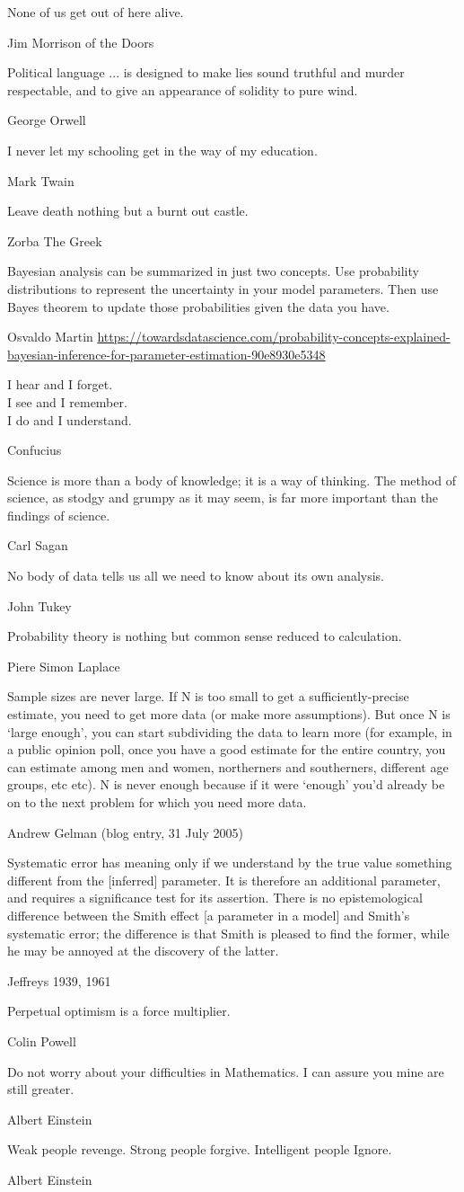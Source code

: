 \epigraph{None of us get out of here alive.}{Jim Morrison of the Doors}
\epigraph{Political language ... is designed to make lies sound truthful and murder respectable, and to give an appearance of solidity to pure wind.}{George Orwell}
\epigraph{I never let my schooling get in the way of my education.}{Mark Twain}
\epigraph{Leave death nothing but a burnt out castle.}{Zorba The Greek}
\epigraph{Bayesian analysis can be summarized in just two concepts. Use probability distributions to represent the uncertainty in your model parameters. Then use Bayes theorem to update those probabilities given the data you have.}{Osvaldo Martin \url{https://towardsdatascience.com/probability-concepts-explained-bayesian-inference-for-parameter-estimation-90e8930e5348}}
\epigraph{I hear and I forget. \\ I see and I remember. \\ I do and I understand.}{Confucius}
\epigraph{Science is more than a body of knowledge; it is a way of thinking. The method of science, as stodgy and grumpy as it may seem, is far more important than the findings of science.}{Carl Sagan}
\epigraph{No body of data tells us all we need to know about its own analysis.}{John Tukey}
\epigraph{Probability theory is nothing but common sense reduced to calculation.}{Piere Simon Laplace}
\epigraph{Sample sizes are never large. If N is too small to get a sufficiently-precise estimate, you need to get more data (or make more assumptions). But once N is `large enough', you can start subdividing the data to learn more (for example, in a public opinion poll, once you have a good estimate for the entire country, you can estimate among men and women, northerners and southerners, different age groups, etc etc). N is never enough because if it were `enough' you'd already be on to the next problem for which you need more data.}{Andrew Gelman (blog entry, 31 July 2005)}
\epigraph{Systematic error has meaning only if we understand by the true value something different from the [inferred] parameter. It is therefore an additional parameter, and requires a significance test for its assertion. There is no epistemological difference between the Smith effect [a parameter in a model] and Smith’s systematic error; the difference is that Smith is pleased to find the former, while he may be annoyed at the discovery of the latter.}{Jeffreys 1939, 1961}
\epigraph{Perpetual optimism is a force multiplier.}{Colin Powell}
\epigraph{Do not worry about your difficulties in Mathematics. I can assure you mine are still greater.}{Albert Einstein}
\epigraph{Weak people revenge. Strong people forgive. Intelligent people Ignore.}{Albert Einstein} 

